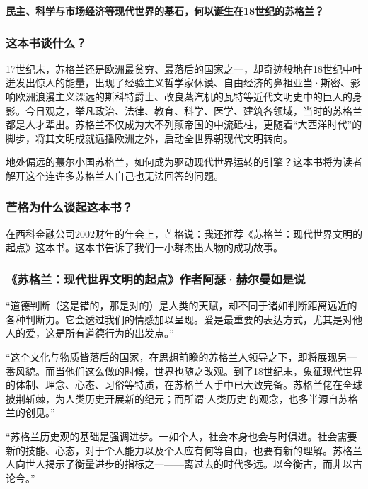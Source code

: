 \cleardoublepage
{}


\begin{BookSummaryBox}
\textbf{民主、科学与市场经济等现代世界的基石，何以诞生在18世纪的苏格兰？}
\par
\end{BookSummaryBox}

\subsubsection*{这本书谈什么？}

17世纪末，苏格兰还是欧洲最贫穷、最落后的国家之一，却奇迹般地在18世纪中叶迸发出惊人的能量，出现了经验主义哲学家休谟、自由经济的鼻祖亚当·斯密、影响欧洲浪漫主义深远的斯科特爵士、改良蒸汽机的瓦特等近代文明史中的巨人的身影。今日观之，举凡政治、法律、教育、科学、医学、建筑各领域，当时的苏格兰都是人才辈出。苏格兰不仅成为大不列颠帝国的中流砥柱，更随着“大西洋时代”的脚步，将其文明成就远播欧洲之外，启动全世界朝现代文明转向。
\par

地处偏远的蕞尔小国苏格兰，如何成为驱动现代世界运转的引擎？这本书将为读者解开这个连许多苏格兰人自己也无法回答的问题。
\par

\subsubsection*{芒格为什么谈起这本书？}

在西科金融公司2002财年的年会上，芒格说：我还推荐《苏格兰：现代世界文明的起点》这本书。这本书告诉了我们一小群杰出人物的成功故事。
\par

\subsubsection*{《苏格兰：现代世界文明的起点》作者阿瑟·赫尔曼如是说}

“道德判断（这是错的，那是对的）是人类的天赋，却不同于诸如判断距离远近的各种判断力。它会透过我们的情感加以呈现。爱是最重要的表达方式，尤其是对他人的爱，这是所有道德行为的出发点。”
\par

“这个文化与物质皆落后的国家，在思想前瞻的苏格兰人领导之下，即将展现另一番风貌。而当他们这么做的时候，世界也随之改观。到了18世纪末，象征现代世界的体制、理念、心态、习俗等特质，在苏格兰人手中已大致完备。苏格兰佬在全球披荆斩棘，为人类历史开展新的纪元；而所谓‘人类历史’的观念，也多半源自苏格兰的创见。”
\par

“苏格兰历史观的基础是强调进步。一如个人，社会本身也会与时俱进。社会需要新的技能、心态，对于个人能力以及个人应有何等自由，也要有新的理解。苏格兰人向世人揭示了衡量进步的指标之一——离过去的时代多远。以今衡古，而非以古论今。”
\par

